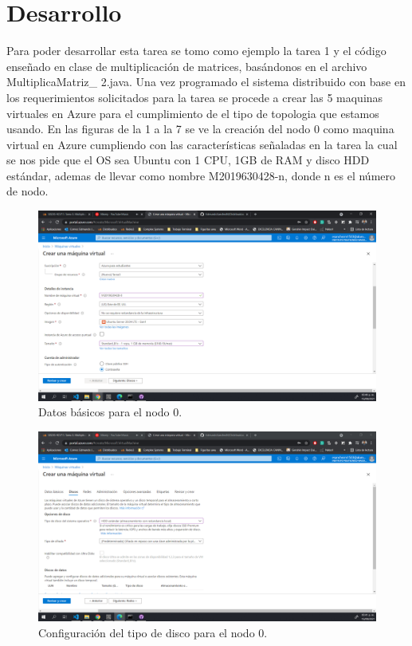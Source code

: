 \documentclass[11pt]{article}
\begin{document}
	\section{Desarrollo}
Para poder desarrollar esta tarea se tomo como ejemplo la tarea 1 y el código enseñado en clase de multiplicación de matrices, basándonos en el archivo MultiplicaMatriz\_ 2.java. Una vez programado el sistema distribuido con base en los requerimientos solicitados para la tarea se procede a crear las 5 maquinas virtuales en Azure para el cumplimiento de el tipo de topologia que estamos usando. En las figuras de la 1 a la 7 se ve la creación del nodo 0 como maquina virtual en Azure cumpliendo con las características señaladas en la tarea la cual se nos pide que el OS sea Ubuntu con 1 CPU, 1GB de RAM y disco HDD estándar, ademas de llevar como nombre M2019630428-n, donde n es el número de nodo.
		\begin{figure}[H]
			\centering
			\includegraphics[scale=0.34]{resources/datosbasicos.png}
			\caption{Datos básicos para el nodo 0. }\label{fig:picture}
		\end{figure}
		\begin{figure}[H]
			\centering
			\includegraphics[scale=0.34]{resources/datosdisco.png}
			\caption{Configuración del tipo de disco para el nodo 0. }\label{fig:picture}
		\end{figure}
\end{document}
